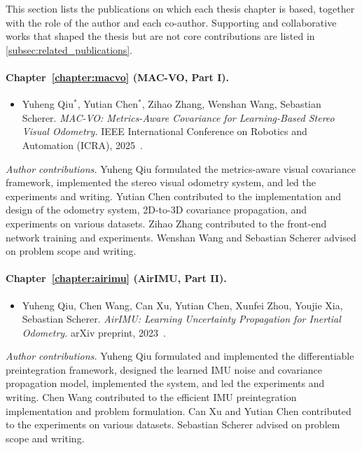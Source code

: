 This section lists the publications on which each thesis chapter is based, together with the role of the author and each co-author.
Supporting and collaborative works that shaped the thesis but are not core contributions are listed in \cref{subsec:related_publications}.

\paragraph{Chapter~\ref{chapter:macvo} (MAC-VO, Part I).}
\begin{itemize}
    \item Yuheng Qiu$^{*}$, Yutian Chen$^{*}$, Zihao Zhang, Wenshan Wang, Sebastian Scherer. \emph{MAC-VO: Metrics-Aware Covariance for Learning-Based Stereo Visual Odometry.} IEEE International Conference on Robotics and Automation (ICRA), 2025~\cite{qiu2025mac}.
\end{itemize}
\textit{Author contributions.}
Yuheng Qiu formulated the metrics-aware visual covariance framework, implemented the stereo visual odometry system, and led the experiments and writing.
Yutian Chen contributed to the implementation and design of the odometry system, 2D-to-3D covariance propagation, and experiments on various datasets.
Zihao Zhang contributed to the front-end network training and experiments.
Wenshan Wang and Sebastian Scherer advised on problem scope and writing.

\paragraph{Chapter~\ref{chapter:airimu} (AirIMU, Part II).}
\begin{itemize}
    \item Yuheng Qiu, Chen Wang, Can Xu, Yutian Chen, Xunfei Zhou, Youjie Xia, Sebastian Scherer. \emph{AirIMU: Learning Uncertainty Propagation for Inertial Odometry.} arXiv preprint, 2023~\cite{qiu2023airimu}.
\end{itemize}
\textit{Author contributions.}
Yuheng Qiu formulated and implemented the differentiable preintegration framework, designed the learned IMU noise and covariance propagation model, implemented the system, and led the experiments and writing.
Chen Wang contributed to the efficient IMU preintegration implementation and problem formulation.
Can Xu and Yutian Chen contributed to the experiments on various datasets.
Sebastian Scherer advised on problem scope and writing.

